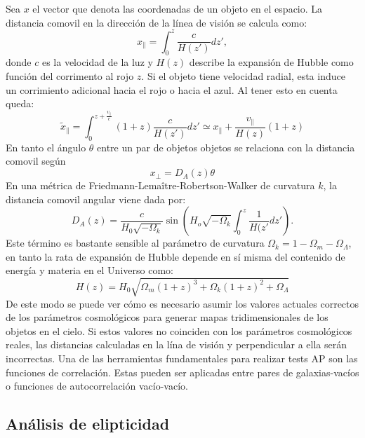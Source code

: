 \documentclass[preprint]{aastex62}
\begin{document}
  Sea $x$ el vector que denota las coordenadas de un objeto en el espacio. La distancia comovil en la
  dirección de la línea de visión se calcula como:
  \begin{equation}
    x_{\parallel} = \int _0 ^z \frac{c}{H(z')}dz',
  \end{equation}
  donde $c$ es la velocidad de la luz y $H(z)$ describe la expansión de Hubble como función del
  corrimento al rojo $z$. Si el objeto tiene velocidad radial, esta induce un corrimiento adicional
  hacia el rojo o hacia el azul. Al tener esto en cuenta queda:
  \begin{equation}
    \tilde{x}_{\parallel} = \int _0 ^{z + \frac{v_\parallel}{c}}(1+z) \frac{c}{H(z')}dz'
    \simeq x_\parallel + \frac{v_\parallel}{H(z)}(1+z)
  \end{equation}
  En tanto el ángulo $\theta$  entre un par de objetos objetos se relaciona con la distancia comovil según
  \begin{equation}
    x_{\perp} = D_A(z)\theta
  \end{equation} 
  En una métrica de  Friedmann-Lema\^itre-Robertson-Walker de curvatura $k$, la distancia
  comovil angular viene dada por:
  \begin{equation}
    D_A(z) = \frac{c}{H_0\sqrt{-\Omega_k}} \sin \left( H_o\sqrt{-\Omega_k}
    \int_0^z \frac{1}{H(z'} dz' \right).
  \end{equation}
  Este término es bastante sensible al parámetro de curvatura
  $\Omega_k = 1 - \Omega_m - \Omega_\Lambda$, en tanto la rata de expansión de Hubble
  depende en sí misma del contenido de energía y materia en el Universo como:
  \begin{equation}
    H(z) = H_0 \sqrt{ \Omega_m(1+z)^3 + \Omega_k(1+z)^2+\Omega_\Lambda}
  \end{equation}
  De este modo se puede ver cómo es necesario asumir los valores actuales correctos de los
  parámetros cosmológicos para generar mapas tridimensionales de los objetos en el cielo. Si
  estos valores no coinciden con los parámetros
  cosmológicos reales, las distancias calculadas en la lína de visión y perpendicular a ella serán
  incorrectas. Una de las herramientas fundamentales para realizar tests AP son las funciones
  de correlación. Estas pueden ser aplicadas entre pares de galaxias-vacíos o funciones de
  autocorrelación vacío-vacío.
  
  \subsection{Análisis de elipticidad}
  
\end{document}
